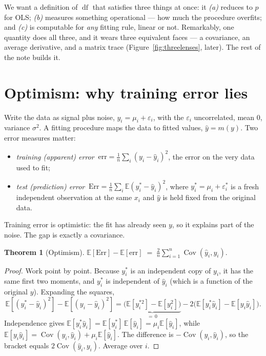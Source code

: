 \documentclass[11pt]{article}
\DeclareMathOperator{\Cov}{Cov}
\DeclareMathOperator{\df}{df}
\newcommand{\E}{\mathbb{E}}
\newcommand{\yhat}{\hat y}
\theoremstyle{definition}
\theoremstyle{plain}
\newtheorem{theorem}{Theorem}
\begin{document}
We want a definition of $\df$ that satisfies three things at once: it
\emph{(a)} reduces to $p$ for OLS; \emph{(b)} measures something operational ---
how much the procedure overfits; and \emph{(c)} is computable for \emph{any}
fitting rule, linear or not. Remarkably, one quantity does all three, and it
wears three equivalent faces --- a covariance, an average derivative, and a
matrix trace (Figure~\ref{fig:threelenses}, later). The rest of the note builds
it.

\section{Optimism: why training error lies}

Write the data as signal plus noise, $y_i = \mu_i + \varepsilon_i$, with the
$\varepsilon_i$ uncorrelated, mean $0$, variance $\sigma^2$. A fitting procedure
maps the data to fitted values, $\yhat = m(y)$. Two error measures matter:

\begin{itemize}[nosep,leftmargin=1.4em]
\item \emph{training (apparent) error} $\ \mathrm{err}=\tfrac1n\sum_i (y_i-\yhat_i)^2$,
the error on the very data used to fit;
\item \emph{test (prediction) error} $\ \mathrm{Err}=\tfrac1n\sum_i \E(y_i^\ast-\yhat_i)^2$,
where $y_i^\ast=\mu_i+\varepsilon_i^\ast$ is a fresh independent observation at the
same $x_i$ and $\yhat$ is held fixed from the original data.
\end{itemize}

Training error is optimistic: the fit has already seen $y$, so it explains part
of the noise. The gap is exactly a covariance.

\begin{theorem}[Optimism]\label{thm:optimism}
$\displaystyle \E[\mathrm{Err}] - \E[\mathrm{err}] \;=\; \frac{2}{n}\sum_{i=1}^n \Cov(\yhat_i, y_i).$
\end{theorem}

\begin{proof}
Work point by point. Because $y_i^\ast$ is an independent copy of $y_i$, it has the
same first two moments, and $y_i^\ast$ is independent of $\yhat_i$ (which is a
function of the original $y$). Expanding the squares,
\[
\E[(y_i^\ast-\yhat_i)^2]-\E[(y_i-\yhat_i)^2]
= \underbrace{\big(\E[y_i^{\ast2}]-\E[y_i^2]\big)}_{=\,0}
- 2\big(\E[y_i^\ast \yhat_i]-\E[y_i \yhat_i]\big).
\]
Independence gives $\E[y_i^\ast \yhat_i]=\E[y_i^\ast]\,\E[\yhat_i]=\mu_i\E[\yhat_i]$,
while $\E[y_i \yhat_i]=\Cov(y_i,\yhat_i)+\mu_i\E[\yhat_i]$. The difference is
$-\Cov(y_i,\yhat_i)$, so the bracket equals $2\Cov(\yhat_i,y_i)$. Average over $i$.
\end{proof}
\end{document}
